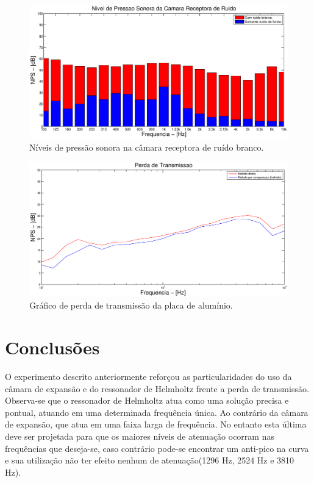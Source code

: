 \begin{figure}[h]
\hspace{-4.5cm}
\includegraphics[scale=0.6]{codigo/pressao_sonora_receptora.eps}
\caption{Níveis de pressão sonora na câmara receptora de ruído branco.}
\label{resultado_2}
\end{figure}

\begin{figure}[h]
\hspace{-4.5cm}
\includegraphics[scale=0.6]{codigo/perda_transmissao.eps}
\caption{Gráfico de perda de transmissão da placa de alumínio.}
\label{resultado_3}
\end{figure}


\chapter{Conclusões}\label{conclusoes}

O experimento descrito anteriormente reforçou as particularidades do uso da câmara de expansão e do ressonador de Helmholtz frente a perda de transmissão. Observa-se que o ressonador de Helmholtz atua como uma solução precisa e pontual, atuando em uma determinada frequência única. Ao contrário da câmara de expansão, que atua em uma faixa larga de frequência. No entanto esta última deve ser projetada para que os maiores níveis de atenuação ocorram nas frequências que deseja-se, caso contrário pode-se encontrar um anti-pico na curva e sua utilização não ter efeito nenhum de atenuação(1296 Hz, 2524 Hz e 3810 Hz).